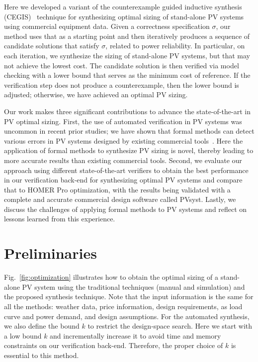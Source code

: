 \documentclass[runningheads]{llncs}
\begin{document}
Here we developed a variant of the counterexample guided inductive synthesis (CEGIS)~\cite{DBLP:conf/asplos/Solar-LezamaTBSS06} technique for synthesizing optimal sizing of stand-alone PV systems using commercial equipment data. Given a correctness specification $\sigma$, our method uses that as a starting point and then iteratively produces a sequence of candidate solutions that satisfy $\sigma$, related to power reliability. In particular, on each iteration, we synthesize the sizing of stand-alone PV systems, but that may not achieve the lowest cost. The candidate solution is then verified via model checking with a lower bound that serves as the minimum cost of reference. If the verification step does not produce a counterexample, then the lower bound is adjusted; otherwise, we have achieved an optimal PV sizing.

Our work makes three significant contributions to advance the state-of-the-art in PV optimal sizing. First, the use of automated verification in PV systems was uncommon in recent prior studies; we have shown that formal methods can detect various errors in PV systems designed by existing commercial tools~\cite{TrindadeCordeiro19}. Here the application of formal methods to synthesize PV sizing is novel, thereby leading to more accurate results than existing commercial tools. Second, we evaluate our approach using different state-of-the-art verifiers to obtain the best performance in our verification back-end for synthesizing optimal PV systems and compare that to HOMER Pro optimization, with the results being validated with a complete and accurate commercial design software called PVsyst. Lastly, we discuss the challenges of applying formal methods to PV systems and reflect on lessons learned from this experience.

\vspace{-2ex}

\section{Preliminaries}
\label{sec:AutomatedVerification}
\vspace{-1ex}

Fig.~\ref{fig:optimization} illustrates how to obtain the optimal sizing of a stand-alone PV system using the traditional techniques (manual and simulation) and the proposed synthesis technique. Note that the input information is the same for all the methods: weather data, price information, design requirements, as load curve and power demand, and design assumptions. For the automated synthesis, we also define the bound $k$ to restrict the design-space search. Here we start with a low bound $k$ and incrementally increase it to avoid time and memory constraints on our verification back-end. Therefore, the proper choice of $k$ is essential to this method.
\end{document}
